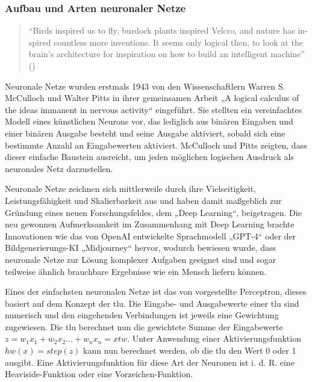 \subsubsection{Aufbau und Arten neuronaler Netze}

\begin{quote}
  "`Birds inspired us to fly, burdock plants inspired Velcro, and nature has in- spired countless more inventions. It seems only logical then, to look at the brain’s architecture for inspiration on how to build an intelligent machine"' (\cite[S. 279]{Geron2019})
\end{quote}

Neuronale Netze wurden erstmals 1943 von den Wissenschaftlern Warren S. McCulloch und Walter Pitts in ihrer gemeinsamen Arbeit „A logical calculus of the ideas immanent in nervous activity“ \cite{McCulloch1943} eingeführt. Sie stellten ein vereinfachtes Modell eines künstlichen Neurons vor, das lediglich aus binären Eingaben und einer binären Ausgabe besteht und seine Ausgabe aktiviert, sobald sich eine bestimmte Anzahl an Eingabewerten aktiviert. McCulloch und Pitts zeigten, dass dieser einfache Baustein ausreicht, um jeden möglichen logischen Ausdruck als neuronales Netz darzustellen.

Neuronale Netze zeichnen sich mittlerweile durch ihre Vielseitigkeit, Leistungsfähigkeit und Skalierbarkeit aus und haben damit maßgeblich zur Gründung eines neuen Forschungsfeldes, dem „Deep Learning“, beigetragen. \cite{Geron2019} Die neu gewonnen Aufmerksamkeit im Zusammenhang mit Deep Learning brachte Innovationen wie das von OpenAI entwickelte Sprachmodell „GPT-4“ oder der Bildgenerierungs-KI „Midjourney“ hervor, wodurch bewiesen wurde, dass neuronale Netze zur Lösung komplexer Aufgaben geeignet sind und sogar teilweise ähnlich brauchbare Ergebnisse wie ein Mensch liefern können. \cite{OpenAI2024}

Eines der einfachsten neuronalen Netze ist das von \cite{Rosenblatt1958} vorgestellte Perceptron, dieses basiert auf dem Konzept der \ac{tlu}. Die Eingabe- und Ausgabewerte einer \ac{tlu} sind numerisch und den eingehenden Verbindungen ist jeweils eine Gewichtung zugewiesen. Die \ac{tlu} berechnet nun die gewichtete Summe der Eingabewerte \(z=w_1x_1+w_2x_2 ... +w_nx_n=xtw\). Unter Anwendung einer Aktivierungsfunktion \(hw(x)=step(z)\) kann nun berechnet werden, ob die \ac{tlu} den Wert 0 oder 1 ausgibt. Eine Aktivierungsfunktion für diese Art der Neuronen ist i. d. R. eine Heaviside-Funktion oder eine Vorzeichen-Funktion. \cite[vgl. S. 284 ff.]{Geron2019}

